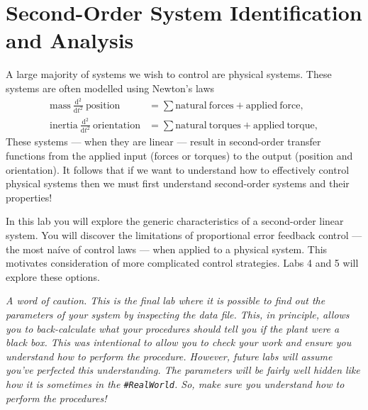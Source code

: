 \chapter{Second-Order System Identification and Analysis}\label{Lab:2}
A large majority of systems we wish to control are physical systems. These
systems are often modelled using Newton's laws
\[
\begin{aligned}
  \mathrm{mass}~\frac{\mathrm d^2}{\mathrm{d}t^2}~\mathrm{position}
    &= \sum \mathrm{natural~forces} + \mathrm{applied~force},\\
  \mathrm{inertia}~\frac{\mathrm d^2}{\mathrm{d}t^2}~\mathrm{orientation}
    &= \sum \mathrm{natural~torques} + \mathrm{applied~torque},
\end{aligned}
\]
These systems --- when
they are linear --- result in second-order transfer functions from the
applied input (forces or torques) to the output (position and orientation).
It follows that if we want to understand how to effectively control physical
systems then we must first understand second-order systems and their
properties!

In this lab you will explore the generic characteristics of a second-order
linear system. You will discover the limitations of proportional error
feedback control --- the most na\'ive of control laws --- when applied to
a physical system. This motivates consideration of
more complicated control strategies. Labs 4 and 5 will explore these options.

\emph{A word of caution. This is the final lab where it is possible to find out the parameters of your system by inspecting the data file.
This, in principle, allows you to back-calculate what your procedures should
tell you if the plant were a black box. This was intentional to allow
you to check your work and ensure you understand how to perform the procedure.
However, future labs will assume you've perfected this understanding.
The parameters will be fairly well hidden like how it is sometimes in the
\texttt{\#RealWorld}. So, make sure you understand how to perform the
procedures!}

